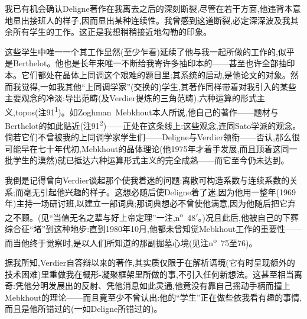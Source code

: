 我已有机会确认Deligne著作在我离去之后的深刻断裂,尽管在若干方面,他违背本意地显出接班人的样子,因而显出某种连续性。我曾感到这道断裂,必定深深波及我其余所有学生的工作。这正是我想稍稍接近地勾勒的印象。

这些学生中唯一一个其工作显然(至少乍看)延续了他与我一起所做的工作的,似乎是Berthelot。他也是长年来唯一不断给我寄许多抽印本的——甚至也许全部抽印本。它们都处在晶体上同调这个艰难的题目里;其系统的启动,是他论文的对象。然而我觉得,一如我其他“上同调学家”(交换的)学生,其著作同样带着对我引入的某些主要观念的冷淡:导出范畴(及Verdier提炼的三角范畴),六种运算的形式主义,topos(注91\textsuperscript{1})。如Zoghman~Mebkhout本人所说,他自己的著作——题材与Berthelot的如此贴近(注91\textsuperscript{2})——正处在这条线上:这些观念,连同Sato学派的观念。倘若它们不曾被我的上同调学家学生们——Deligne与Verdier领衔——否认,那么很可能早在七十年代初,Mebkhout的晶体理论(他1975年才着手发展,而且顶着这同一批学生的漠然)就已抵达六种\dmark{}运算形式主义的完全成熟——而它至今仍未达到。

我倒是记得曾向Verdier谈起那个使我着迷的问题:离散可构造系数与连续系数的关系;而毫无引起他兴趣的样子。这想必随后使Deligne着了迷,因为他用一整年(1969年)主持一场研讨班,以建立一部词典;那词典想必不曾使他满意,因为他随后把它弃之不顾。(见“当值无名之辈与好上帝定理”一注,n\textsuperscript{o}~48$'$。)况且此后,他被自己的下葬综合征“堵”到这种地步:直到1980年10月,他都未曾知觉Mebkhout工作的重要性——而当他终于觉察时,是以人们所知道的那副掘墓心境(见注n\textsuperscript{o}~75至76)。

据我所知,Verdier自答辩以来的著作,其实质仅限于在解析语境(它有时呈现额外的技术困难)里重做我在概形-凝聚框架里所做的事,不引入任何新想法。这甚至相当离奇:凭他分明发展出的反射、凭他消息如此灵通,他竟没有靠自己摇动手柄而撞上Mebkhout的理论——而且竟至少不曾认出:他的“学生”正在做些依我看有趣的事情,而且是他所错过的(一如Deligne所错过的)。


